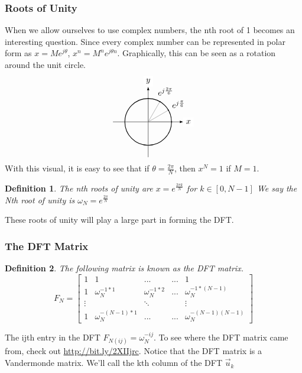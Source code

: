 \documentclass{article}
\newtheorem{definition}{Definition}
\begin{document}
\subsubsection{Roots of Unity}
When we allow ourselves to use complex numbers, the nth root of 1 becomes an interesting question.
Since every complex number can be represented in polar form as $x = Me^{j\theta}$, $x^n = M^ne^{j\theta n}$.
Graphically, this can be seen as a rotation around the unit circle.
\[
    \begin{tikzpicture}[scale=1,cap=round,>=latex]
        \draw[->] (-1.5,0) -- (1.5cm,0cm) node[right,fill=white] {$x$};
        \draw[->] (0cm,-1.5cm) -- (0cm,1.5cm) node[above,fill=white] {$y$};
        \draw[thick] (0cm,0cm) circle(1cm);
        \foreach \x in {0,30,...,90} {
                \draw[gray] (0cm,0cm) -- (\x:1cm);
                \filldraw[black] (\x:1) circle(0.4pt);
        }
        \foreach \x/\xtext in {30/e^{j\frac{\pi}{6}}, 60/e^{j\frac{2\pi}{6}}}
            \draw (\x:1.5cm) node[] {$\xtext$};
    \end{tikzpicture}
\]
With this visual, it is easy to see that if $\theta = \frac{2\pi}{N}$, then $x^N=1$ if $M=1$.
\begin{definition}
    The nth roots of unity are $x = e^{\frac{2\pi k}{N}}$ for $k\in[0,N-1]$
    We say the Nth root of unity is $\omega_N = e^{\frac{2\pi}{N}}$
\end{definition}
These roots of unity will play a large part in forming the DFT.
\subsubsection{The DFT Matrix}
\begin{definition}
    The following matrix is known as the DFT matrix.
    \[
        F_N =
        \left[
            \begin{array}{ccccc}
                1 & 1 & ... & ... & 1\\
                1 & \omega_N^{-1*1} & \omega_N^{-1*2} & ... & \omega_N^{-1 * (N-1)}\\
                \vdots & & \ddots & & \vdots\\
                1 & \omega_N^{-(N-1)*1} & ... & ... & \omega_N^{-(N-1)(N-1)}
            \end{array}
        \right]
    \]
\end{definition}
The ijth entry in the DFT $F_{N(ij)}=\omega_N^{-ij}$.
To see where the DFT matrix came from, check out \url{http://bit.ly/2XIIjrc}.
Notice that the DFT matrix is a Vandermonde matrix. We'll call the kth column of the DFT $\vec{u}_k$
\end{document}
